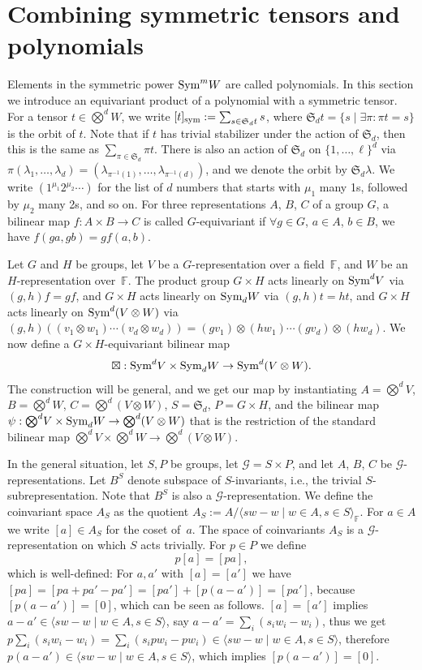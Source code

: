 \documentclass[a4paper]{extarticle}
\newcommand{\aS}{\mathfrak{S}}
\newcommand{\IF}{\mathbb{F}}
\newcommand{\tensor}{{\textstyle\bigotimes}}
\newcommand{\Sym}{\textup{Sym}}
\newcommand{\sym}{\textup{sym}}
\newcommand{\la}{\lambda}
\numberwithin{theorem}{section}
\theoremstyle{definition}
\begin{document}
\section{Combining symmetric tensors and polynomials}
Elements in the symmetric power $\Sym^m W$ are called polynomials.
In this section we introduce an equivariant product of a polynomial with a symmetric tensor.
For a tensor $t \in \tensor^d W$, we write $[t]_\sym := \sum_{s\in\aS_d t} s$,
where $\aS_d t = \{s \mid \exists \pi: \pi t = s\}$ is the orbit of $t$.
Note that if $t$ has trivial stabilizer under the action of $\aS_d$, then this is the same as $\sum_{\pi\in\aS_d} \pi t$.
There is also an action of $\aS_d$ on $\{1,\ldots,\ell\}^d$ via $\pi(\la_1,\ldots,\la_d)=(\la_{\pi^{-1}(1)},\ldots,\la_{\pi^{-1}(d)})$, and we denote the orbit by $\aS_d \la$. We write $(1^{\mu_1} 2^{\mu_2}\cdots)$ for the list of $d$ numbers that starts with $\mu_1$ many 1s, followed by $\mu_2$ many 2s, and so on.
For three representations $A$, $B$, $C$ of a group $G$, a bilinear map $f:A\times B\to C$ is called $G$-equivariant if $\forall g\in G$, $a\in A$, $b\in B$, we have $f(ga,gb)=gf(a,b)$.

Let $G$ and $H$ be groups, let $V$ be a $G$-representation over a field~$\IF$, and $W$ be an $H$-representation over~$\IF$.
The product group $G\times H$ acts linearly on $\Sym^d V$ via $(g,h)f = gf$,
and $G\times H$ acts linearly on $\Sym_d W$ via $(g,h)t = ht$,
and $G\times H$ acts linearly on $\Sym^d(V \otimes W)$ via $(g,h)((v_{1}\otimes w_{1})\cdots (v_{d}\otimes w_{d})) = (g v_{1})\otimes (h w_{1})\cdots (g v_{d})\otimes (h w_{d})$.
We now define a $G\times H$-equivariant bilinear map
\[
\boxtimes: \Sym^d V \times \Sym_d W \to \Sym^d(V\otimes W).
\]
The construction will be general, and we get our map by instantiating $A = \tensor^d V$, $B = \tensor^d W$, $C = \tensor^d(V\otimes W)$, $S=\aS_d$, $P=G\times H$,
and the bilinear map $\psi: \tensor^d V \times \Sym_d W \to \tensor^d(V\otimes W)$ that
is the restriction of the standard bilinear map $\tensor^d V \times \tensor^d W \to \tensor^d(V\otimes W)$.


In the general situation,
let $S,P$ be groups, let $\mathcal{G} = S\times P$, and let $A$, $B$, $C$ be $\mathcal{G}$-representations. Let $B^S$ denote subspace of $S$-invariants, i.e., the trivial $S$-subrepresentation.
Note that $B^S$ is also a $\mathcal{G}$-representation.
We define the coinvariant space $A_S$ as the quotient
$A_S := A/\langle sw-w\mid w\in A, s\in S\rangle_\IF$.
For $a\in A$ we write $[a] \in A_S$ for the coset of~$a$.
The space of coinvariants $A_S$ is a $\mathcal{G}$-representation on which $S$ acts trivially.
For $p\in P$ we define
\begin{equation}\label{eq:pa}
p[a]=[pa],
\end{equation}
which is well-defined: For $a,a'$ with $[a]=[a']$
we have $[pa] = [pa + pa' -pa'] = [pa'] + [p(a-a')] = [pa']$,
because $[p(a-a')]=[0]$, which can be seen as follows.
$[a]=[a']$ implies $a-a'\in \langle sw-w \mid w \in A,s\in S\rangle$, say $a-a'=\sum_i (s_i w_i - w_i)$,
thus we get $p \sum_i (s_i w_i - w_i) = \sum_i (s_i p w_i - p w_i) \in \langle sw-w \mid w \in A,s\in S\rangle$, therefore $p(a-a')\in \langle sw-w \mid w \in A,s\in S\rangle$, which implies $[p(a-a')]=[0]$.
\end{document}
